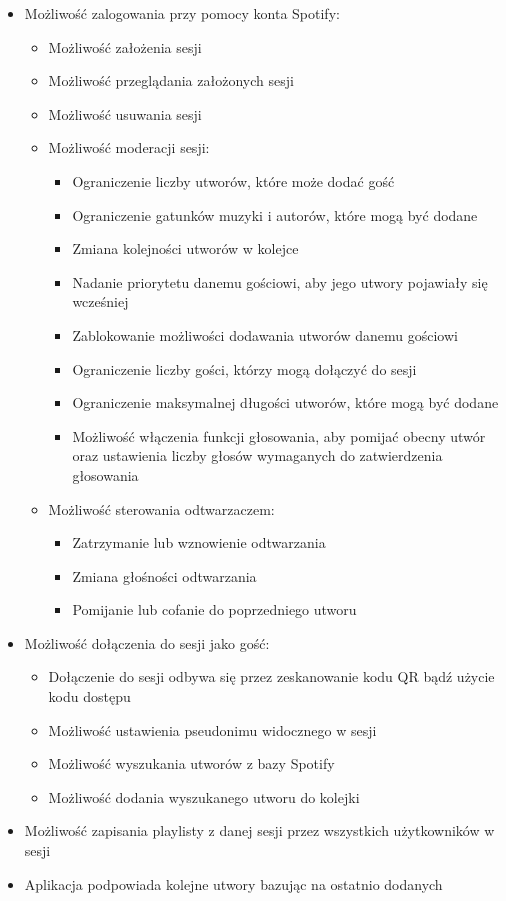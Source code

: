 \begin{itemize}
	\item Możliwość zalogowania przy pomocy konta Spotify:
	\begin{itemize}
		\item Możliwość założenia sesji
		\item Możliwość przeglądania założonych sesji
		\item Możliwość usuwania sesji
		\item Możliwość moderacji sesji:
			\begin{itemize}
				\item Ograniczenie liczby utworów, które może dodać gość 
				\item Ograniczenie gatunków muzyki i autorów, które mogą być dodane
				\item Zmiana kolejności utworów w kolejce 
				\item Nadanie priorytetu danemu gościowi, aby jego utwory pojawiały się wcześniej 
				\item Zablokowanie możliwości dodawania utworów danemu gościowi 
				\item Ograniczenie liczby gości, którzy mogą dołączyć do sesji 
				\item Ograniczenie maksymalnej długości utworów, które mogą być dodane
				\item Możliwość włączenia funkcji głosowania, aby pomijać obecny utwór oraz ustawienia liczby głosów wymaganych do zatwierdzenia głosowania 
			\end{itemize}
			
		\item Możliwość sterowania odtwarzaczem:
		\begin{itemize}
			\item Zatrzymanie lub wznowienie odtwarzania
			\item Zmiana głośności odtwarzania
			\item Pomijanie lub cofanie do poprzedniego utworu 
		\end{itemize}
	\end{itemize} 
	
	\item Możliwość dołączenia do sesji jako gość: 
	\begin{itemize}
		\item Dołączenie do sesji odbywa się przez zeskanowanie kodu QR bądź użycie kodu dostępu 
		\item Możliwość ustawienia pseudonimu widocznego w sesji 
		\item Możliwość wyszukania utworów z bazy Spotify 
		\item Możliwość dodania wyszukanego utworu do kolejki
	\end{itemize}
	
	\item Możliwość zapisania playlisty z danej sesji przez wszystkich użytkowników w sesji
	\item Aplikacja podpowiada kolejne utwory bazując na ostatnio dodanych 
\end{itemize}

